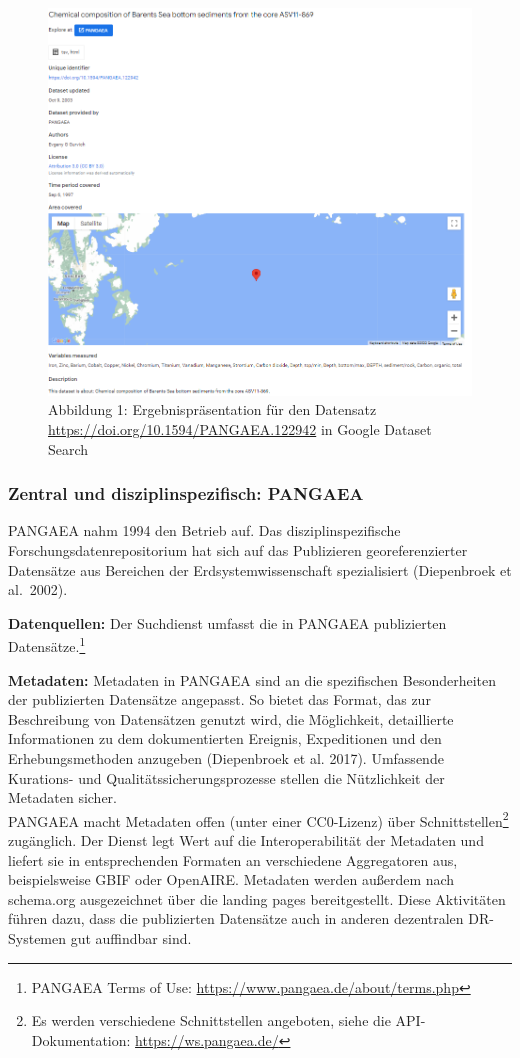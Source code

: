 \documentclass[a4paper,
fontsize=11pt,
oneside,
numbers=noperiodatend,
parskip=half-,
bibliography=totoc,
final
]{scrartcl}
\begin{document}
\begin{figure}
\centering
\includegraphics[width=.6\textwidth]{img/abb1_GDS_results.png}
\caption{Abbildung 1: Ergebnispräsentation für den Datensatz
\url{https://doi.org/10.1594/PANGAEA.122942} in Google Dataset Search}
\end{figure}

\hypertarget{zentral-und-disziplinspezifisch-pangaea}{%
\subsubsection{Zentral und disziplinspezifisch:
PANGAEA}\label{zentral-und-disziplinspezifisch-pangaea}}

PANGAEA nahm 1994 den Betrieb auf. Das disziplinspezifische
Forschungsdatenrepositorium hat sich auf das Publizieren
georeferenzierter Datensätze aus Bereichen der Erdsystemwissenschaft
spezialisiert (Diepenbroek et al.~2002).

\textbf{Datenquellen:} Der Suchdienst umfasst die in PANGAEA
publizierten Datensätze.\footnote{PANGAEA Terms of Use:
  \url{https://www.pangaea.de/about/terms.php}}

\textbf{Metadaten:} Metadaten in PANGAEA sind an die spezifischen
Besonderheiten der publizierten Datensätze angepasst. So bietet das
Format, das zur Beschreibung von Datensätzen genutzt wird, die
Möglichkeit, detaillierte Informationen zu dem dokumentierten Ereignis,
Expeditionen und den Erhebungsmethoden anzugeben (Diepenbroek et al.
2017). Umfassende Kurations- und Qualitätssicherungsprozesse stellen die
Nützlichkeit der Metadaten sicher.\\
PANGAEA macht Metadaten offen (unter einer CC0-Lizenz) über
Schnittstellen\footnote{Es werden verschiedene Schnittstellen angeboten,
  siehe die API-Dokumentation: \url{https://ws.pangaea.de/}}
zugänglich. Der Dienst legt Wert auf die Interoperabilität der Metadaten
und liefert sie in entsprechenden Formaten an verschiedene Aggregatoren
aus, beispielsweise GBIF oder OpenAIRE. Metadaten werden außerdem nach
schema.org ausgezeichnet über die landing pages bereitgestellt. Diese
Aktivitäten führen dazu, dass die publizierten Datensätze auch in
anderen dezentralen DR-Systemen gut auffindbar sind.
\end{document}
